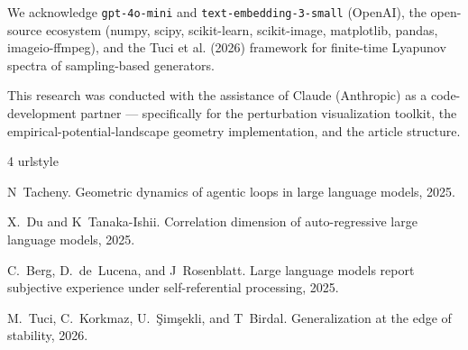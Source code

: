 \documentclass{article}
\theoremstyle{plain}
\theoremstyle{definition}
\begin{document}
We acknowledge \texttt{gpt-4o-mini} and \texttt{text-embedding-3-small} (OpenAI),
the open-source ecosystem (numpy, scipy, scikit-learn, scikit-image,
matplotlib, pandas, imageio-ffmpeg), and the Tuci et al. (2026)
\citet{arxiv260419740} framework for finite-time Lyapunov spectra of
sampling-based generators.

This research was conducted with the assistance of Claude (Anthropic)
as a code-development partner — specifically for the perturbation
visualization toolkit, the empirical-potential-landscape geometry implementation,
and the article structure.





\begin{thebibliography}{4}
\providecommand{\natexlab}[1]{#1}
\providecommand{\url}[1]{\texttt{#1}}
\expandafter\ifx\csname urlstyle\endcsname\relax
  \providecommand{\doi}[1]{doi: #1}\else
  \providecommand{\doi}{doi: \begingroup \urlstyle{rm}\Url}\fi

N~Tacheny.
\newblock Geometric dynamics of agentic loops in large language models, 2025.

X.~Du and K~Tanaka-Ishii.
\newblock Correlation dimension of auto-regressive large language models, 2025.

C.~Berg, D.~de~Lucena, and J~Rosenblatt.
\newblock Large language models report subjective experience under
  self-referential processing, 2025.

M.~Tuci, C.~Korkmaz, U.~Şimşekli, and T~Birdal.
\newblock Generalization at the edge of stability, 2026.

\end{thebibliography}
\end{document}
